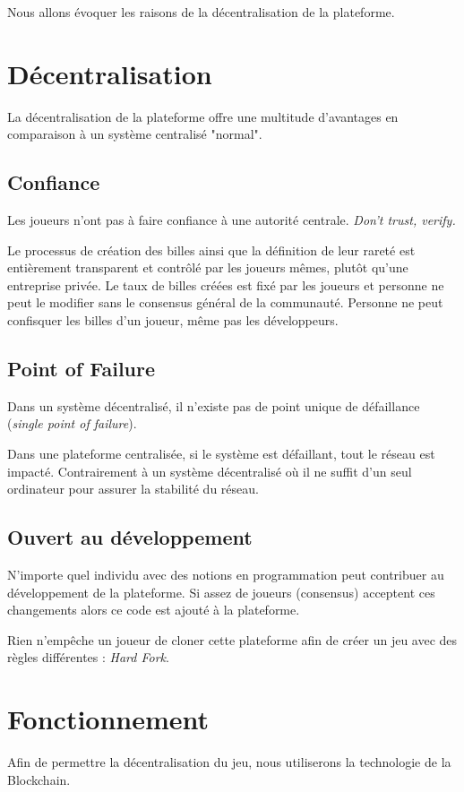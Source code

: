 \documentclass{article}
\begin{document}
Nous allons évoquer les raisons de la décentralisation de la plateforme.

\section{Décentralisation}
La décentralisation de la plateforme offre une multitude d'avantages en comparaison à un système centralisé "normal".

\subsection{Confiance}
Les joueurs n'ont pas à faire confiance à une autorité centrale. 
\textit{Don't trust, verify.}

Le processus de création des billes ainsi que la définition de leur rareté est entièrement transparent et contrôlé par les joueurs mêmes, plutôt qu'une entreprise privée. Le taux de billes créées est fixé par les joueurs et personne ne peut le modifier sans le consensus général de la communauté. Personne ne peut confisquer les billes d'un joueur, même pas les développeurs.

\subsection{Point of Failure}
Dans un système décentralisé, il n'existe pas de point unique de défaillance (\textit{single point of failure}). 

Dans une plateforme centralisée, si le système est défaillant, tout le réseau est impacté. Contrairement à un système décentralisé où il ne suffit d'un seul ordinateur pour assurer la stabilité du réseau.

\subsection{Ouvert au développement}
N'importe quel individu avec des notions en programmation peut contribuer au développement de la plateforme.
Si assez de joueurs (consensus) acceptent ces changements alors ce code est ajouté à la plateforme.

Rien n'empêche un joueur de cloner cette plateforme afin de créer un jeu avec des règles différentes : \textit{Hard Fork}.

\section{Fonctionnement}
Afin de permettre la décentralisation du jeu, nous utiliserons la technologie de la Blockchain.
\end{document}
